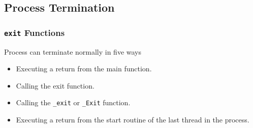 \documentclass[newPxFont,sthlmFooter,nooffset]{beamer}
\begin{document}
\subsection{Process Termination}
\begin{frame}[t]
  \frametitle{\texttt{exit} Functions}
Process can terminate normally in five ways
  \begin{itemize}
  \item Executing a return from the main function.

  \item Calling the exit function.

  \item Calling the \texttt{\_exit} or \texttt{\_Exit} function.

  \item Executing a return from the start routine of the last thread
    in the process.


\end{itemize}
\end{frame}
\end{document}
